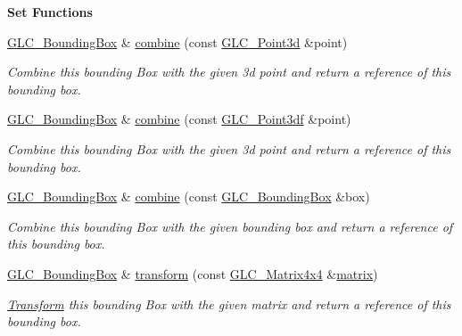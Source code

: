 \begin{Indent}{\bf Set Functions}\par
\begin{DoxyCompactItemize}
\item 
\hyperlink{class_g_l_c___bounding_box}{G\-L\-C\-\_\-\-Bounding\-Box} \& \hyperlink{class_g_l_c___bounding_box_ac1a16af241c5f5bdac409f61b275494d}{combine} (const \hyperlink{glc__vector3d_8h_a4e13a9bbc7ab3d34de7e98b41836772c}{G\-L\-C\-\_\-\-Point3d} \&point)
\begin{DoxyCompactList}\small\item\em Combine this bounding Box with the given 3d point and return a reference of this bounding box. \end{DoxyCompactList}\item 
\hyperlink{class_g_l_c___bounding_box}{G\-L\-C\-\_\-\-Bounding\-Box} \& \hyperlink{class_g_l_c___bounding_box_a01185018326564152228dfee30be9bf6}{combine} (const \hyperlink{glc__vector3df_8h_a433841665e7ab0e1f29a0c68ce0d1cc7}{G\-L\-C\-\_\-\-Point3df} \&point)
\begin{DoxyCompactList}\small\item\em Combine this bounding Box with the given 3d point and return a reference of this bounding box. \end{DoxyCompactList}\item 
\hyperlink{class_g_l_c___bounding_box}{G\-L\-C\-\_\-\-Bounding\-Box} \& \hyperlink{class_g_l_c___bounding_box_a934744e162952f8dd996526ffbf4c5e9}{combine} (const \hyperlink{class_g_l_c___bounding_box}{G\-L\-C\-\_\-\-Bounding\-Box} \&box)
\begin{DoxyCompactList}\small\item\em Combine this bounding Box with the given bounding box and return a reference of this bounding box. \end{DoxyCompactList}\item 
\hyperlink{class_g_l_c___bounding_box}{G\-L\-C\-\_\-\-Bounding\-Box} \& \hyperlink{class_g_l_c___bounding_box_abcad0babfcb4e58abe649a4120a73c77}{transform} (const \hyperlink{class_g_l_c___matrix4x4}{G\-L\-C\-\_\-\-Matrix4x4} \&\hyperlink{glext_8h_a7b24a3f2f56eb1244ae69dacb4fecb6f}{matrix})
\begin{DoxyCompactList}\small\item\em \hyperlink{class_transform}{Transform} this bounding Box with the given matrix and return a reference of this bounding box. \end{DoxyCompactList}\end{DoxyCompactItemize}
\end{Indent}
